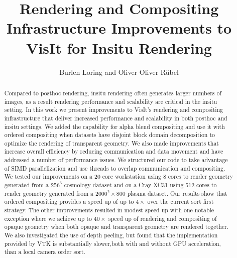 \documentclass[a4paper,10pt]{report}
\title{Rendering and Compositing Infrastructure Improvements to VisIt for Insitu Rendering}
\author{Burlen Loring and Oliver Oliver R\"ubel}
\begin{document}
\maketitle

\begin{abstract}
Compared to posthoc rendering, insitu rendering often generates larger numbers of images, as a result rendering performance and scalability are critical in the insitu setting. In this work we present improvements to VisIt's rendering and compositing infrastructure that deliver increased performance and scalability in both posthoc and insitu settings. We added the capability for alpha blend compositing and use it with ordered compositing when datasets have disjoint block domain decomposition to optimize the rendering of transparent geometry. We also made improvements that increase overall efficiency by reducing communication and data movement and have addressed a number of performance issues. We structured our code to take advantage of SIMD parallelization and use threads to overlap communication and compositing. We tested our improvements on a 20 core workstation using 8 cores to render geometry generated from a $256^3$ cosmology dataset and on a Cray XC31 using 512 cores to render geometry generated from a $2000^2 \times 800$ plasma dataset. Our results show that ordered compositing provides a speed up of up to $4 \times$ over the current sort first strategy. The other improvements resulted in modest speed up with one notable exception where we achieve up to $40 \times$ speed up of rendering and compositing of opaque geometry when both opaque and transparent geometry are rendered together. We also investigated the use of depth peeling, but found that the implementation provided by VTK is substantially slower,both with and without GPU acceleration, than a local camera order sort.
\end{abstract}
\end{document}
